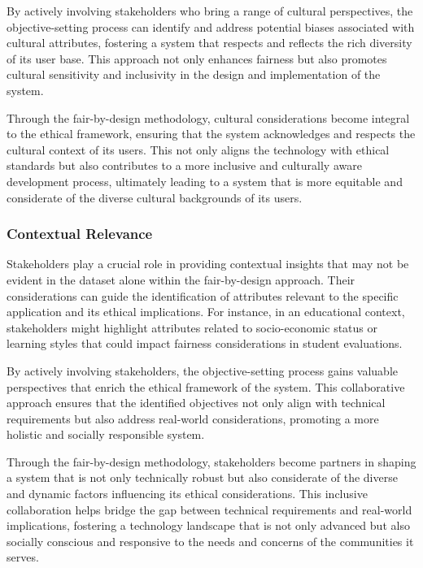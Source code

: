 By actively involving stakeholders who bring a range of cultural perspectives, the objective-setting process can identify and address potential biases associated with cultural attributes, fostering a system that respects and reflects the rich diversity of its user base. This approach not only enhances fairness but also promotes cultural sensitivity and inclusivity in the design and implementation of the system.

Through the fair-by-design methodology, cultural considerations become integral to the ethical framework, ensuring that the system acknowledges and respects the cultural context of its users. This not only aligns the technology with ethical standards but also contributes to a more inclusive and culturally aware development process, ultimately leading to a system that is more equitable and considerate of the diverse cultural backgrounds of its users.

\subsubsection{Contextual Relevance}

Stakeholders play a crucial role in providing contextual insights that may not be evident in the dataset alone within the fair-by-design approach. Their considerations can guide the identification of attributes relevant to the specific application and its ethical implications. For instance, in an educational context, stakeholders might highlight attributes related to socio-economic status or learning styles that could impact fairness considerations in student evaluations.

By actively involving stakeholders, the objective-setting process gains valuable perspectives that enrich the ethical framework of the system. This collaborative approach ensures that the identified objectives not only align with technical requirements but also address real-world considerations, promoting a more holistic and socially responsible system.

Through the fair-by-design methodology, stakeholders become partners in shaping a system that is not only technically robust but also considerate of the diverse and dynamic factors influencing its ethical considerations. This inclusive collaboration helps bridge the gap between technical requirements and real-world implications, fostering a technology landscape that is not only advanced but also socially conscious and responsive to the needs and concerns of the communities it serves.

